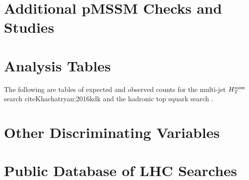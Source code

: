 \appendix
\chapter{Additional pMSSM Checks and Studies}
\label{app:pMSSMstudies}



\chapter{Analysis Tables}
\label{app:anatables}
The following are tables of expected and observed counts for the multi-jet $H_{\text{T}}^{\rm miss}$ search cite{Khachatryan:2016kdk} and the hadronic top squark search \cite{CMS:2016nhb}.
%


\chapter{Other Discriminating Variables}
\label{app:discriminators}


\chapter{Public Database of LHC Searches}
\label{chap:ma5}

